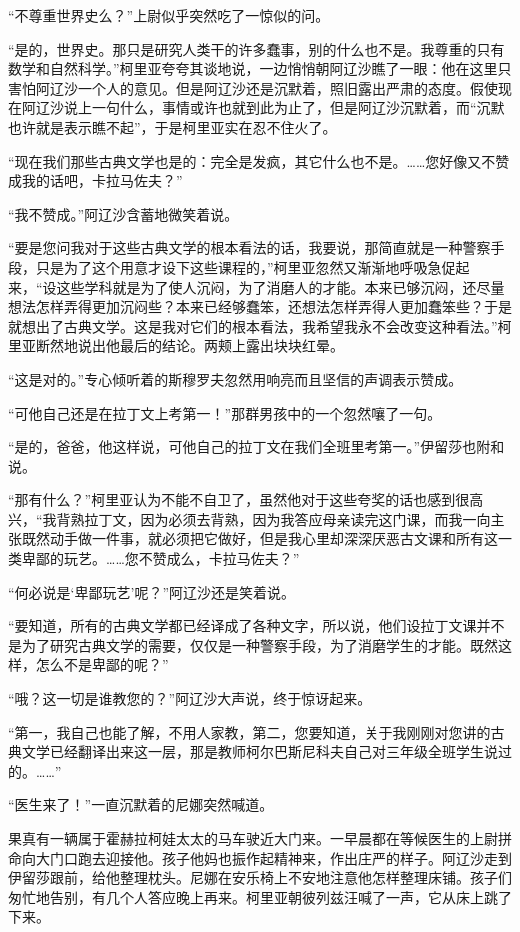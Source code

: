 \par “不尊重世界史么？”上尉似乎突然吃了一惊似的问。
\par “是的，世界史。那只是研究人类干的许多蠢事，别的什么也不是。我尊重的只有数学和自然科学。”柯里亚夸夸其谈地说，一边悄悄朝阿辽沙瞧了一眼：他在这里只害怕阿辽沙一个人的意见。但是阿辽沙还是沉默着，照旧露出严肃的态度。假使现在阿辽沙说上一句什么，事情或许也就到此为止了，但是阿辽沙沉默着，而“沉默也许就是表示瞧不起”，于是柯里亚实在忍不住火了。
\par “现在我们那些古典文学也是的：完全是发疯，其它什么也不是。……您好像又不赞成我的话吧，卡拉马佐夫？”
\par “我不赞成。”阿辽沙含蓄地微笑着说。
\par “要是您问我对于这些古典文学的根本看法的话，我要说，那简直就是一种警察手段，只是为了这个用意才设下这些课程的，”柯里亚忽然又渐渐地呼吸急促起来，“设这些学科就是为了使人沉闷，为了消磨人的才能。本来已够沉闷，还尽量想法怎样弄得更加沉闷些？本来已经够蠢笨，还想法怎样弄得人更加蠢笨些？于是就想出了古典文学。这是我对它们的根本看法，我希望我永不会改变这种看法。”柯里亚断然地说出他最后的结论。两颊上露出块块红晕。
\par “这是对的。”专心倾听着的斯穆罗夫忽然用响亮而且坚信的声调表示赞成。
\par “可他自己还是在拉丁文上考第一！”那群男孩中的一个忽然嚷了一句。
\par “是的，爸爸，他这样说，可他自己的拉丁文在我们全班里考第一。”伊留莎也附和说。
\par “那有什么？”柯里亚认为不能不自卫了，虽然他对于这些夸奖的话也感到很高兴，“我背熟拉丁文，因为必须去背熟，因为我答应母亲读完这门课，而我一向主张既然动手做一件事，就必须把它做好，但是我心里却深深厌恶古文课和所有这一类卑鄙的玩艺。……您不赞成么，卡拉马佐夫？”
\par “何必说是‘卑鄙玩艺’呢？”阿辽沙还是笑着说。
\par “要知道，所有的古典文学都已经译成了各种文字，所以说，他们设拉丁文课并不是为了研究古典文学的需要，仅仅是一种警察手段，为了消磨学生的才能。既然这样，怎么不是卑鄙的呢？”
\par “哦？这一切是谁教您的？”阿辽沙大声说，终于惊讶起来。
\par “第一，我自己也能了解，不用人家教，第二，您要知道，关于我刚刚对您讲的古典文学已经翻译出来这一层，那是教师柯尔巴斯尼科夫自己对三年级全班学生说过的。……”
\par “医生来了！”一直沉默着的尼娜突然喊道。
\par 果真有一辆属于霍赫拉柯娃太太的马车驶近大门来。一早晨都在等候医生的上尉拼命向大门口跑去迎接他。孩子他妈也振作起精神来，作出庄严的样子。阿辽沙走到伊留莎跟前，给他整理枕头。尼娜在安乐椅上不安地注意他怎样整理床铺。孩子们匆忙地告别，有几个人答应晚上再来。柯里亚朝彼列兹汪喊了一声，它从床上跳了下来。

